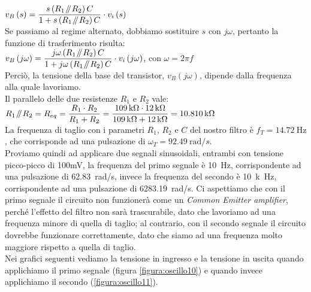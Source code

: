\documentclass{report}
\newcommand{\parallelsum}{\mathbin{\!/\mkern-5mu/\!}}
\begin{document}
\\[2pt]\indent $\displaystyle{v_B\left(s\right)=\frac{s\left(R_1\parallelsum R_2\right)C}{1+s\left(R_1\parallelsum R_2\right)C}\cdot v_i\left(s\right)}$
\\[2pt]Se passiamo al regime alternato, dobbiamo sostituire $s$ con $j\omega$, pertanto la funzione di trasferimento risulta: 
\\[2pt]\indent $\displaystyle{v_B\left(j\omega\right)=\frac{j\omega\left(R_1\parallelsum R_2\right)C}{1+j\omega\left(R_1\parallelsum R_2\right)C}\cdot v_i\left(j\omega\right)}$, con $\displaystyle{\omega=2\pi f}$
\\[2pt]Perciò, la tensione della base del transistor, $v_B\left(j\omega\right)$, dipende dalla frequenza alla quale lavoriamo.
\\Il parallelo delle due resistenze $R_1$ e $R_2$ vale:
\\[2pt]\indent $\displaystyle{R_1\parallelsum R_2=R_{eq}=\frac{R_1\cdot R_2}{R_1+R_2}=\frac{\SI{109}{k\ohm}\cdot\SI{12}{k\ohm}}{\SI{109}{k\ohm}+\SI{12}{k\ohm}}=\SI{10.810}{k\ohm}}$
\\[2pt]La frequenza di taglio con i parametri $R_1$, $R_2$ e $C$ del nostro filtro è $f_T=\SI{14.72}{\hertz}$, che corrisponde ad una pulsazione di $\omega_T=\SI{92.49}{\radian/s}$. 
\\\indent Proviamo quindi ad applicare due segnali sinusoidali, entrambi con tensione picco-picco di 100mV, la frequenza del primo segnale è \SI{10}{\hertz}, corrispondente ad una pulsazione di \SI{62.83}{\radian/s}, invece la frequenza del secondo è \SI{10}{k\hertz}, corrispondente ad una pulsazione di \SI{6283.19}{\radian/s}. Ci aspettiamo che con il primo segnale il circuito non funzionerà come un \textit{Common Emitter amplifier}, perché l'effetto del filtro non sarà trascurabile, dato che lavoriamo ad una frequenza minore di quella di taglio; al contrario, con il secondo segnale il circuito dovrebbe funzionare correttamente, dato che siamo ad una frequenza molto maggiore rispetto a quella di taglio.
\\\indent Nei grafici seguenti vediamo la tensione in ingresso e la tensione in uscita quando applichiamo il primo segnale (figura \ref{figura:oscillo10}) e quando invece applichiamo il secondo (\ref{figura:oscillo11}).
\end{document}

